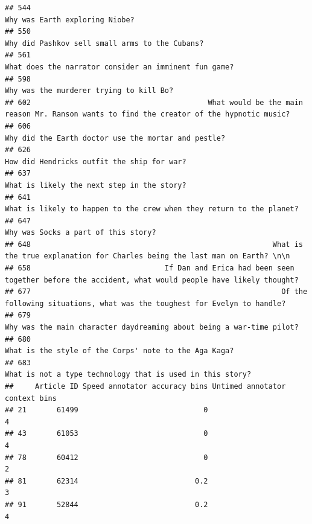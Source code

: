 \documentclass[
]{article}
\begin{document}
\begin{verbatim}
## 544                                                                                                    Why was Earth exploring Niobe?
## 550                                                                                    Why did Pashkov sell small arms to the Cubans?
## 561                                                                             What does the narrator consider an imminent fun game?
## 598                                                                                           Why was the murderer trying to kill Bo?
## 602                                         What would be the main reason Mr. Ranson wants to find the creator of the hypnotic music?
## 606                                                                               Why did the Earth doctor use the mortar and pestle?
## 626                                                                                        How did Hendricks outfit the ship for war?
## 637                                                                                        What is likely the next step in the story?
## 641                                                             What is likely to happen to the crew when they return to the planet? 
## 647                                                                                               Why was Socks a part of this story?
## 648                                                        What is the true explanation for Charles being the last man on Earth? \n\n
## 658                               If Dan and Erica had been seen together before the accident, what would people have likely thought?
## 677                                                          Of the following situations, what was the toughest for Evelyn to handle?
## 679                                                              Why was the main character daydreaming about being a war-time pilot?
## 680                                                                             What is the style of the Corps' note to the Aga Kaga?
## 683                                                                         What is not a type technology that is used in this story?
##     Article ID Speed annotator accuracy bins Untimed annotator context bins
## 21       61499                             0                              4
## 43       61053                             0                              4
## 78       60412                             0                              2
## 81       62314                           0.2                              3
## 91       52844                           0.2                              4

\end{verbatim}
\end{document}
